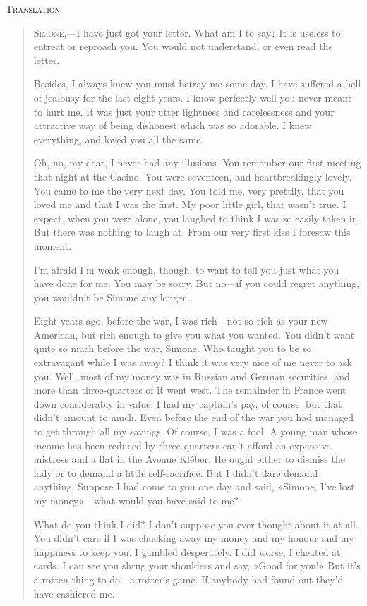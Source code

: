 \begin{center}\Large
\textsc{Translation}
\end{center}

\begin{quotation}
\textsc{Simone},—I have just got your letter. What am I to say? It is useless to entreat or reproach you. You would not understand, or even read the letter.

Besides, I always knew you must betray me some day. I have suffered a hell of jealousy for the last eight years. I know perfectly well you never meant to hurt me. It was just your utter lightness and carelessness and your attractive way of being dishonest which was so adorable. I knew everything, and loved you all the same.

Oh, no, my dear, I never had any illusions. You remember our first meeting that night at the Casino. You were seventeen, and heartbreakingly lovely. You came to me the very next day. You told me,
very prettily, that you loved me and that I was the first. My poor little girl, that wasn't true. I expect, when you were alone, you laughed to think I was so easily taken in. But there was nothing to laugh at. From our very first kiss I foresaw this moment.

I'm afraid I'm weak enough, though, to want to tell you just what you have done for me. You may be sorry. But no—if you could regret anything, you wouldn't be Simone any longer.

Eight years ago, before the war, I was rich—not so rich as your new American, but rich enough to give you what you wanted. You didn't want quite so much before the war, Simone. Who taught you to be so extravagant while I was away? I think it was very nice of me never to ask you. Well, most of my money was in Russian and German securities, and more than three-quarters of it went west. The remainder in France went down considerably in value. I had my captain's pay, of course, but that didn't amount to much. Even before the end of the war you had managed to get through all my savings. Of course, I was a fool. A young man whose income has been reduced by three-quarters can't afford an expensive mistress and a flat in the Avenue Kléber. He ought either to dismiss the lady or to demand a little self-sacrifice. But I didn't dare demand anything. Suppose I had come to you one day and said, »Simone, I've lost my money«—what would you have said to me?

What do you think I did? I don't suppose you ever thought about it at all. You didn't care if I was chucking away my money and my honour and my happiness to keep you. I gambled desperately. I did worse, I cheated at cards. I can see you shrug your shoulders and say, »Good for you!« But it's a rotten thing to do—a rotter's game. If anybody had found out they'd have cashiered me.


\end{quotation}
